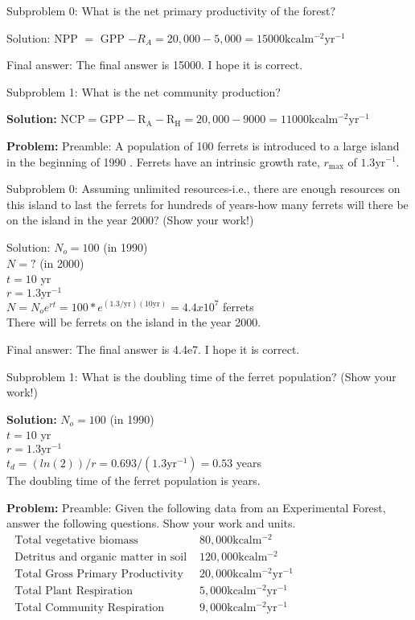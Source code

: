 \documentclass[10pt]{article}
\begin{document}
Subproblem 0: What is the net primary productivity of the forest?


Solution: NPP $=$ GPP $-R_{A}=20,000-5,000=\boxed{15000} \mathrm{kcal} \mathrm{m}^{-2} \mathrm{yr}^{-1}$

Final answer: The final answer is 15000. I hope it is correct.

Subproblem 1: What is the net community production?


\textbf{Solution:}
$\mathrm{NCP}=\mathrm{GPP}-\mathrm{R}_{\mathrm{A}}-\mathrm{R}_{\mathrm{H}}=20,000-9000=\boxed{11000} \mathrm{kcal} \mathrm{m}^{-2} \mathrm{yr}^{-1}$


\textbf{Problem:}
Preamble: A population of 100 ferrets is introduced to a large island in the beginning of 1990 . Ferrets have an intrinsic growth rate, $r_{\max }$ of $1.3 \mathrm{yr}^{-1}$.

Subproblem 0: Assuming unlimited resources-i.e., there are enough resources on this island to last the ferrets for hundreds of years-how many ferrets will there be on the island in the year 2000? (Show your work!)


Solution: $N_o = 100$ (in 1990)
\\
$N = ?$ (in 2000)
\\
$t = 10$ yr
\\
$r = 1.3 \text{yr}^{-1}$
\\
$N = N_{o}e^{rt} = 100*e^{(1.3/\text{yr})(10 \text{yr})} = 4.4 x 10^7$ ferrets
\\
There will be  ferrets on the island in the year 2000. 

Final answer: The final answer is 4.4e7. I hope it is correct.

Subproblem 1: What is the doubling time of the ferret population? (Show your work!)


\textbf{Solution:}
$N_o = 100$ (in 1990)
\\
$t = 10$ yr
\\
$r = 1.3 \text{yr}^{-1}$
\\
$t_d = (ln(2))/r = 0.693/(1.3 \text{yr}^{-1}) = 0.53$ years
\\
The doubling time of the ferret population is  years. 


\textbf{Problem:}
Preamble: Given the following data from an Experimental Forest, answer the following questions. Show your work and units.
$\begin{array}{ll}\text { Total vegetative biomass } & 80,000 \mathrm{kcal} \mathrm{m}^{-2} \\ \text { Detritus and organic matter in soil } & 120,000 \mathrm{kcal } \mathrm{m}^{-2} \\ \text { Total Gross Primary Productivity } & 20,000 \mathrm{kcal } \mathrm{m}^{-2} \mathrm{yr}^{-1} \\ \text { Total Plant Respiration } & 5,000 \mathrm{kcal} \mathrm{m}^{-2} \mathrm{yr}^{-1} \\ \text { Total Community Respiration } & 9,000 \mathrm{kcal} \mathrm{m}^{-2} \mathrm{yr}^{-1}\end{array}$
\end{document}
